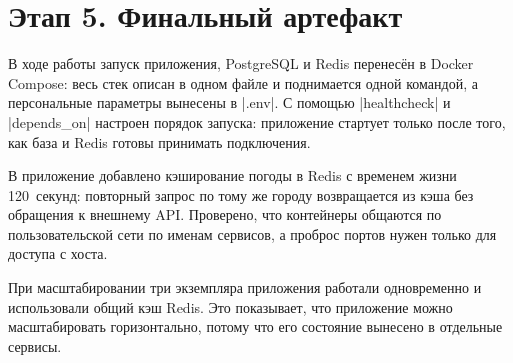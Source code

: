 
\section{Этап 5. Финальный артефакт}



В ходе работы запуск приложения, PostgreSQL и Redis перенесён в Docker
Compose: весь стек описан в одном файле и поднимается одной командой, а
персональные параметры вынесены в \cmd|.env|. С помощью
\cmd|healthcheck| и \cmd|depends_on| настроен порядок запуска:
приложение стартует только после того, как база и Redis готовы принимать
подключения.

В приложение добавлено кэширование погоды в Redis с временем жизни
120~секунд: повторный запрос по тому же городу возвращается из кэша без
обращения к внешнему API. Проверено, что контейнеры общаются по
пользовательской сети по именам сервисов, а проброс портов нужен только
для доступа с хоста.

При масштабировании три экземпляра приложения работали одновременно и
использовали общий кэш Redis. Это показывает, что приложение можно
масштабировать горизонтально, потому что его состояние вынесено в
отдельные сервисы.



\startreportappendices



